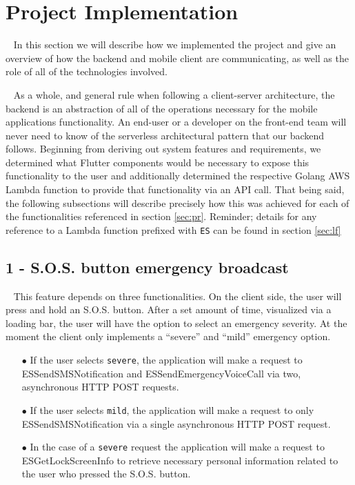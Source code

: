 \documentclass[10pt, a4paper]{article}
\begin{document}
\section{Project Implementation}
\par ~ In this section we will describe how we implemented the project and give an overview of how the backend and mobile client are communicating, as well as the role of all of the technologies involved. 
\par ~ As a whole, and general rule when following a client-server architecture, the backend is an abstraction of all of the operations necessary for the mobile applications functionality. An end-user or a developer on the front-end team will never need to know of the serverless architectural pattern \cite{two} that our backend follows. Beginning from deriving out system features and requirements, we determined what Flutter components would be necessary to expose this functionality to the user and additionally determined the respective Golang AWS Lambda function to provide that functionality via an API call. That being said, the following subsections will describe precisely how this was achieved for each of the functionalities referenced in section \ref{sec:pr}. Reminder; details for any reference to a Lambda function prefixed with \texttt{ES} can be found in section \ref{sec:lf} 

\subsection{1 - S.O.S. button emergency broadcast} 
\par ~ This feature depends on three functionalities. On the client side, the user will press and hold an S.O.S. button. After a set amount of time, visualized via a loading bar, the user will have the option to select an emergency severity. At the moment the client only implements a ``severe'' and ``mild'' emergency option.
	\begin{itemize}
		\item[$\bullet$] If the user selects \texttt{severe}, the application will make a request to ESSendSMSNotification and ESSendEmergencyVoiceCall via two, asynchronous HTTP POST requests.
		\item[$\bullet$] If the user selects \texttt{mild}, the application will make a request to only ESSendSMSNotification via a single asynchronous HTTP POST request. 
		\item[$\bullet$] In the case of a \texttt{severe} request the application will make a request to ESGetLockScreenInfo to retrieve necessary personal information related to the user who pressed the S.O.S. button. 
	\end{itemize}
\end{document}
